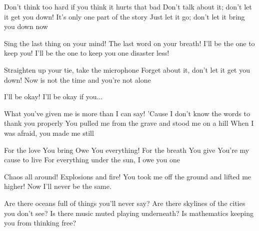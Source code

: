 %
%
%
%


Don't think too hard if you think it hurts that bad
Don't talk about it; don't let it get you down!
It's only one part of the story
Just let it go; don't let it bring you down now

Sing the last thing on your mind!
The last word on your breath!
I'll be the one to keep you!
I'll be the one to keep you one disaster less!

Straighten up your tie, take the microphone
Forget about it, don't let it get you down!
Now is not the time and you're not alone

I'll be okay! I'll be okay if you...


What you've given me is more than I can say!
'Cause I don't know the words to thank you properly
You pulled me from the grave and stood me on a hill
When I was afraid, you made me still

For the love You bring
Owe You everything!
For the breath You give
You're my cause to live
For everything under the sun, I owe you one

Chaos all around! Explosions and fire!
You took me off the ground and lifted me higher!
Now I'll never be the same.


Are there oceans full of things you'll never say?
Are there skylines of the cities you don't see?
Is there music muted playing underneath?
Is mathematics keeping you from thinking free?

